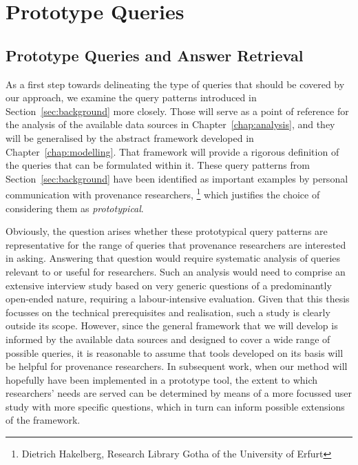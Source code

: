 \chapter{Prototype Queries}
\label{chap:prototype_queries}

\section{Prototype Queries and Answer Retrieval}
\label{sec:prototype_queries}

As a first step towards delineating the type of queries that should be covered by our approach,
we examine the query patterns introduced in Section~\ref{sec:background} more closely.
Those will serve as a point of reference for the analysis of the available data sources
in Chapter~\ref{chap:analysis},
and they will be generalised by the abstract framework developed in Chapter~\ref{chap:modelling}.
That framework will provide a rigorous definition of the queries that can be formulated
within it.
These query patterns from Section~\ref{sec:background} have been identified
as important examples by personal communication
with provenance researchers,%
\footnote{Dietrich Hakelberg, Research Library Gotha of the University of Erfurt}
which justifies the choice of considering them as \emph{prototypical}.

Obviously, the question arises whether these prototypical query patterns are representative
for the range of queries that provenance researchers are interested in asking.
Answering that question would require systematic analysis of queries relevant to or useful for researchers.
Such an analysis would need to comprise an extensive interview study
based on very generic questions of a predominantly open-ended nature,
requiring a labour-intensive evaluation.
Given that this thesis focusses on the technical prerequisites and realisation,
such a study is clearly outside its scope. However, since the general framework that we will develop
is informed by the available data sources
and designed to cover a wide range of possible queries,
it is reasonable to assume that tools developed on its basis will be helpful for provenance researchers.
In subsequent work, when our method will hopefully have been implemented in a prototype tool,
the extent to which researchers' needs are served can be determined by means of a more focussed user study
with more specific questions, which in turn can inform possible extensions of the framework.

